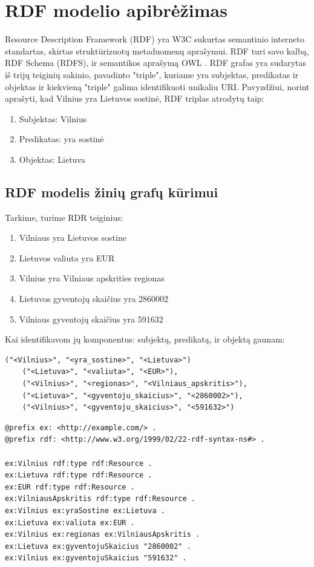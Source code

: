 \documentclass{VUMIFPSkursinis}
\begin{document}
\pagebreak

\section{RDF modelio apibrėžimas}
Resource Description Framework (RDF) yra W3C sukurtas semantinio interneto standartas, skirtas struktūrizuotų metaduomenų aprašymui. RDF turi savo kalbą, RDF Schema (RDFS), ir semantikos aprašymą OWL \cite{wiki:rdf}. RDF grafas yra sudarytas iš trijų teiginių sakinio, pavadinto "triple", kuriame yra subjektas, predikatas ir objektas ir kiekvieną "triple" galima identifikuoti unikaliu URI. Pavyzdžiui, norint aprašyti, kad Vilnius yra Lietuvos sostinė, RDF triplas atrodytų taip:
\begin{enumerate}
    \item Subjektas: Vilnius
    \item Predikatas: yra sostinė
    \item Objektas: Lietuva
    
\end{enumerate}

\subsection{RDF modelis žinių grafų kūrimui}

Tarkime, turime RDR teiginius:
\begin{enumerate}
    \item Vilniaus yra Lietuvos sostine
    \item Lietuvos valiuta yra EUR
    \item Vilnius yra Vilniaus apskrities regionas
    \item Lietuvos gyventojų skaičius yra 2860002
    \item Vilniaus gyventojų skaičius yra 591632
    
\end{enumerate}

Kai identifikavom jų komponentus: subjektą, predikatą, ir objektą gaunam:
\begin{lstlisting}[captionpos=b, caption=Teiginio subjektas; predikatas ir objektas, label=lst:sparql, basicstyle=\ttfamily,frame=single]
    ("<Vilnius>", "<yra_sostine>", "<Lietuva>")
    ("<Lietuva>", "<valiuta>", "<EUR>"),
    ("<Vilnius>", "<regionas>", "<Vilniaus_apskritis>"),
    ("<Lietuva>", "<gyventoju_skaicius>", "<2860002>"),
    ("<Vilnius>", "<gyventoju_skaicius>", "<591632>")
\end{lstlisting}
\begin{lstlisting}[captionpos=b, caption=Teiginio RDF modelis, label=lst:sparql,
   basicstyle=\ttfamily,frame=single]
@prefix ex: <http://example.com/> .
@prefix rdf: <http://www.w3.org/1999/02/22-rdf-syntax-ns#> .

ex:Vilnius rdf:type rdf:Resource .
ex:Lietuva rdf:type rdf:Resource .
ex:EUR rdf:type rdf:Resource .
ex:VilniausApskritis rdf:type rdf:Resource .
ex:Vilnius ex:yraSostine ex:Lietuva .
ex:Lietuva ex:valiuta ex:EUR .
ex:Vilnius ex:regionas ex:VilniausApskritis .
ex:Lietuva ex:gyventojuSkaicius "2860002" .
ex:Vilnius ex:gyventojuSkaicius "591632" .

\end{lstlisting}
\end{document}
